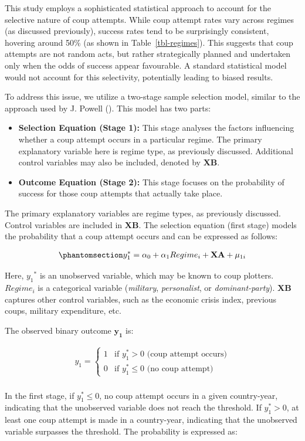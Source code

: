 \documentclass[
  12pt,
]{report}
\begin{document}
This study employs a sophisticated statistical approach to account for
the selective nature of coup attempts. While coup attempt rates vary
across regimes (as discussed previously), success rates tend to be
surprisingly consistent, hovering around 50\% (as shown in
Table~\ref{tbl-regimes}). This suggests that coup attempts are not
random acts, but rather strategically planned and undertaken only when
the odds of success appear favourable. A standard statistical model
would not account for this selectivity, potentially leading to biased
results.

To address this issue, we utilize a two-stage sample selection model,
similar to the approach used by J. Powell
(). This model has two parts:

\begin{itemize}
\item
  \textbf{Selection Equation (Stage 1):} This stage analyses the factors
  influencing whether a coup attempt occurs in a particular regime. The
  primary explanatory variable here is regime type, as previously
  discussed. Additional control variables may also be included, denoted
  by \(\mathbf{XB}\).
\item
  \textbf{Outcome Equation (Stage 2):} This stage focuses on the
  probability of success for those coup attempts that actually take
  place.
\end{itemize}

The primary explanatory variables are regime types, as previously
discussed. Control variables are included in \(\mathbf{XB}\). The
selection equation (first stage) models the probability that a coup
attempt occurs and can be expressed as follows:

\begin{equation}\phantomsection\label{eq-eq4}{
\begin{aligned}
y_1^*=\alpha_0 + \alpha_1 Regime_i + \mathbf {XA} + \mu_{1i}
\end{aligned}
}\end{equation}

Here, \({y_1}^*\) is an unobserved variable, which may be known to coup
plotters. \(Regime_i\) is a categorical variable (\emph{military},
\emph{personalist}, or \emph{dominant-party}). \(\mathbf{XB}\) captures
other control variables, such as the economic crisis index, previous
coups, military expenditure, etc.

The observed binary outcome \(\mathbf{y_1}\) is:

\[
\begin{aligned}
y_1 = 
\begin{cases} 
1 &\text{if $y_1^*>0$ (coup attempt occurs)} \\
0 &\text{if $y_1^*\le0$ (no coup attempt)}
\end{cases}
\end{aligned}
\]\\
In the first stage, if \(y_1^*\le0\), no coup attempt occurs in a given
country-year, indicating that the unobserved variable does not reach the
threshold. If \(y_1^*>0\), at least one coup attempt is made in a
country-year, indicating that the unobserved variable surpasses the
threshold. The probability is expressed as:
\end{document}
